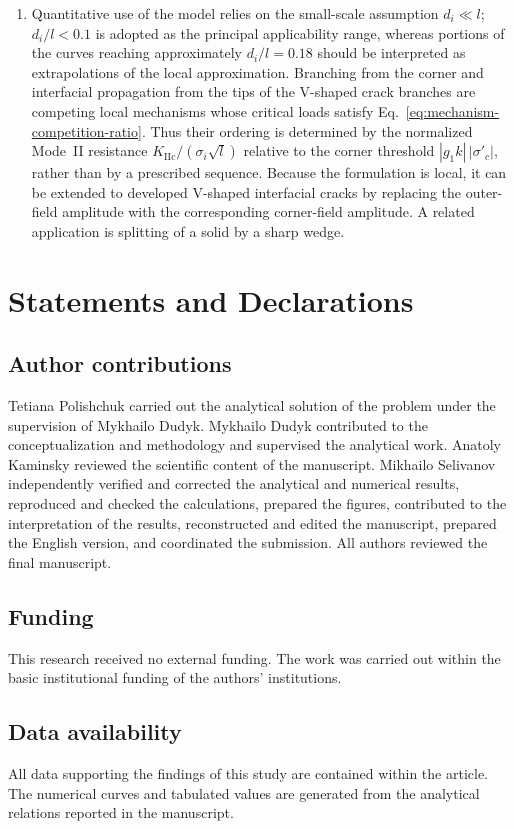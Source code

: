 \documentclass[pdflatex,onecolumn,sn-mathphys-ay]{sn-jnl}
\begin{document}
\begin{enumerate}
\item
Quantitative use of the model relies on the small-scale assumption
$d_i\ll l$; $d_i/l<0.1$ is adopted as the principal applicability range,
whereas portions of the curves reaching approximately $d_i/l=0.18$ should
be interpreted as extrapolations of the local approximation. Branching
from the corner and interfacial propagation from the tips of the V-shaped
crack branches are competing local mechanisms whose critical loads satisfy
Eq.~\eqref{eq:mechanism-competition-ratio}. Thus their ordering is determined
by the normalized Mode~II resistance
$K_{\mathrm{IIc}}/(\sigma_i\sqrt l)$ relative to the corner threshold
$|g_1k|\,|\sigma'_c|$, rather than by a prescribed sequence. Because the
formulation is local, it can be extended to developed V-shaped interfacial
cracks by replacing the outer-field amplitude with the corresponding
corner-field amplitude. A related application is splitting of a solid by a
sharp wedge.
\end{enumerate}


\section*{Statements and Declarations}
\subsection*{Author contributions}
Tetiana Polishchuk carried out the analytical solution of the problem under
the supervision of Mykhailo Dudyk. Mykhailo Dudyk contributed to the
conceptualization and methodology and supervised the analytical work.
Anatoly Kaminsky reviewed the scientific content of the manuscript.
Mikhailo Selivanov independently verified and corrected the analytical and
numerical results, reproduced and checked the calculations, prepared the
figures, contributed to the interpretation of the results, reconstructed and
edited the manuscript, prepared the English version, and coordinated the
submission. All authors reviewed the final manuscript.

\subsection*{Funding}
This research received no external funding. The work was carried out within
the basic institutional funding of the authors' institutions.

\subsection*{Data availability}
All data supporting the findings of this study are contained within the article.
The numerical curves and tabulated values are generated from the analytical
relations reported in the manuscript.
\end{document}
